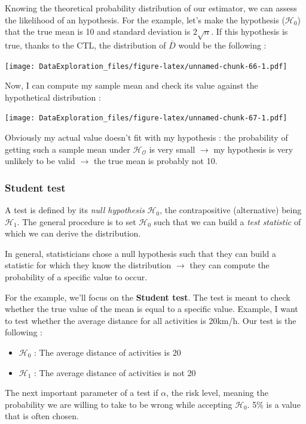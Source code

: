 \documentclass[
]{book}
\providecommand{\tightlist}{%
  \setlength{\itemsep}{0pt}\setlength{\parskip}{0pt}}
\begin{document}
Knowing the theoretical probability distribution of our estimator, we can assess the likelihood of an hypothesis. For the example, let's make the hypothesis (\(\mathcal{H_0}\)) that the true mean is 10 and standard deviation is \(2\sqrt{n}\). If this hypothesis is true, thanks to the CTL, the distribution of \(\bar{D}\) would be the following :

\texttt{[image: DataExploration\_files/figure-latex/unnamed-chunk-66-1.pdf]}

Now, I can compute my sample mean and check its value against the hypothetical distribution :

\texttt{[image: DataExploration\_files/figure-latex/unnamed-chunk-67-1.pdf]}

Obviously my actual value doesn't fit with my hypothesis : the probability of getting such a sample mean under \(\mathcal{H_O}\) is very small \(\rightarrow\) my hypothesis is very unlikely to be valid \(\rightarrow\) the true mean is probably not 10.

\hypertarget{student-test}{%
\subsubsection{Student test}\label{student-test}}

A test is defined by its \emph{null hypothesis} \(\mathcal{H_0}\), the contrapositive (alternative) being \(\mathcal{H_1}\). The general procedure is to set \(\mathcal{H_0}\) such that we can build a \emph{test statistic} of which we can derive the distribution.

In general, statisticians chose a null hypothesis such that they can build a statistic for which they know the distribution \(\rightarrow\) they can compute the probability of a specific value to occur.

For the example, we'll focus on the \textbf{Student test}. The test is meant to check whether the true value of the mean is equal to a specific value. Example, I want to test whether the average distance for all activities is 20km/h. Our test is the following :

\begin{itemize}
\tightlist
\item
  \(\mathcal{H_0}\) : The average distance of activities is 20
\item
  \(\mathcal{H_1}\) : The average distance of activities is not 20
\end{itemize}

The next important parameter of a test if \(\alpha\), the risk level, meaning the probability we are willing to take to be wrong while accepting \(\mathcal{H_0}\). 5\% is a value that is often chosen.
\end{document}

